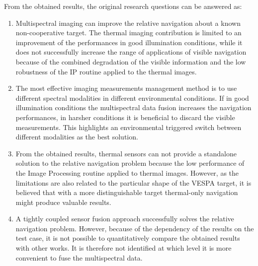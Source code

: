 From the obtained results, the original research questions can be answered as:
\begin{enumerate}
    \item Multispectral imaging can improve the relative navigation about a known non-cooperative target. The thermal imaging contribution is limited to an improvement of the performances in good illumination conditions, while it does not successfully increase the range of applications of visible navigation because of the  combined degradation of the visible information and the low robustness of the IP routine applied to the thermal images.  
    \item The most effective imaging measurements management method is to use different spectral modalities in different environmental conditions. If in good illumination conditions the multispectral data fusion increases the navigation performances, in harsher conditions it is beneficial to discard the visible measurements. This highlights an environmental triggered switch between different modalities as the best solution.
    \item From the obtained results, thermal sensors can not provide a standalone solution to the relative navigation problem because the low performance of the Image Processing routine applied to thermal images. However, as the limitations are also related to the particular shape of the VESPA target, it is believed that with a more distinguishable target thermal-only navigation might produce valuable results.
    \item A tightly coupled sensor fusion approach successfully solves the relative navigation problem. However, because of the dependency of the results on the test case, it is not possible to quantitatively compare the obtained results with other works. It is therefore not identified at which level it is more convenient to fuse the multispectral data. 
\end{enumerate}
